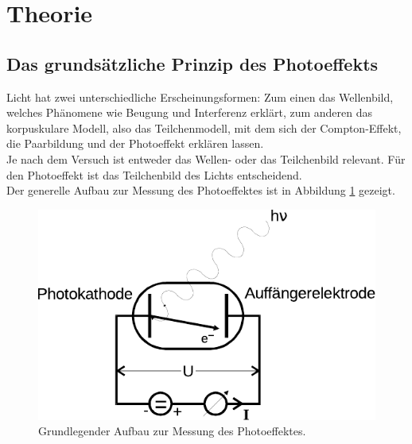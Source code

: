 \section{Theorie}

\subsection{Das grundsätzliche Prinzip des Photoeffekts}

    Licht hat zwei unterschiedliche Erscheinungsformen:
    Zum einen das Wellenbild,
    welches Phänomene wie Beugung und Interferenz erklärt,
    zum anderen das korpuskulare Modell,
    also das Teilchenmodell,
    mit dem sich der Compton-Effekt, die Paarbildung und der Photoeffekt erklären lassen.\\
    Je nach dem Versuch ist entweder das Wellen- oder das Teilchenbild relevant.
    Für den Photoeffekt ist das Teilchenbild des Lichts entscheidend.\\
    Der generelle Aufbau zur Messung des Photoeffektes ist in Abbildung \ref{fig:genAufbau} gezeigt.

    \begin{figure}
        \centering
        \includegraphics[width=\textwidth]{content/img/Abb_1.pdf}
        \caption{Grundlegender Aufbau zur Messung des Photoeffektes.}
        \label{fig:genAufbau}
    \end{figure}

